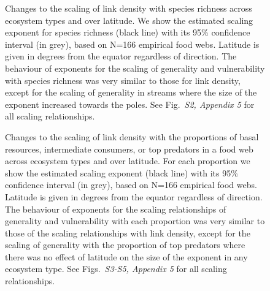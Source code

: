 \documentclass[12pt]{article}
\begin{document}
\begin{figure}[h]
\caption{Changes to the scaling of link density with species richness across ecosystem
types and over latitude. We show the estimated scaling exponent for species richness (black
line) with its 95\% confidence interval (in grey), based on N=166 empirical food webs.
Latitude is given in degrees from the equator regardless of direction. The
behaviour of exponents for the scaling of generality and vulnerability with
species richness was very  similar to those for link density, except for the
scaling of generality in streams where  the size of the exponent increased
towards the poles. See Fig.~\emph{S2, Appendix 5} for  all scaling
relationships.} \label{S} \end{figure}


\begin{figure}[h]
\caption{Changes to the scaling of link density with the proportions of basal resources, intermediate
consumers, or top predators in a food web across ecosystem types and over latitude. For each proportion
we show the estimated scaling exponent (black line) with its 95\% confidence interval (in grey), based
on N=166 empirical food webs. Latitude is given in degrees from the equator regardless of direction. 
The behaviour of exponents for the scaling relationships of generality and vulnerability with each 
proportion was very similar to those of the scaling relationships with link density, except for the 
scaling of generality with the proportion of top predators where there was no effect of latitude on the 
size of the exponent in any ecosystem type. See Figs.~\emph{S3-S5, Appendix 5} for all scaling relationships.}
\label{BIT}
\end{figure}
\end{document}
